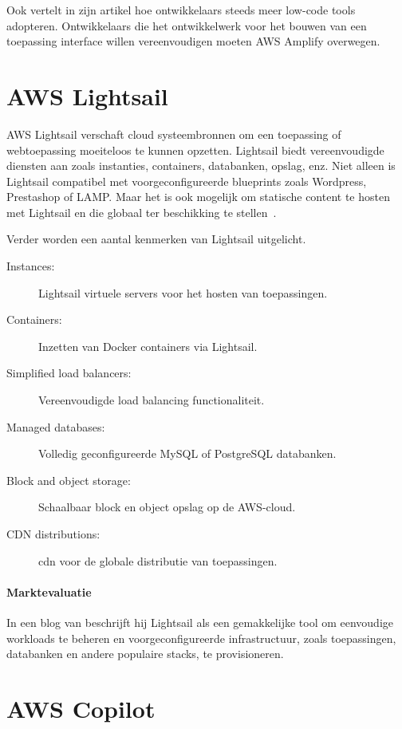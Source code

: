 Ook \textcite{Nwamba2022} vertelt in zijn artikel hoe ontwikkelaars steeds meer low-code tools adopteren.
Ontwikkelaars die het ontwikkelwerk voor het bouwen van een toepassing interface willen vereenvoudigen moeten AWS Amplify overwegen.

\section{AWS Lightsail}
\label{subsec:service-lightsail}

AWS Lightsail verschaft cloud systeembronnen om een toepassing of webtoepassing moeiteloos te kunnen opzetten.
Lightsail biedt vereenvoudigde diensten aan zoals instanties, containers, databanken, opslag, enz.
Niet alleen is Lightsail compatibel met voorgeconfigureerde blueprints zoals Wordpress, Prestashop of LAMP\@.
Maar het is ook mogelijk om statische content te hosten met Lightsail en die globaal ter beschikking te stellen~\autocite{AWSLightsail2022}.

Verder worden een aantal kenmerken van Lightsail uitgelicht.

\begin{description}
    \item[Instances: ] Lightsail virtuele servers voor het hosten van toepassingen.
    \item[Containers: ] Inzetten van Docker containers via Lightsail.
    \item[Simplified load balancers: ] Vereenvoudigde load balancing functionaliteit.
    \item[Managed databases: ] Volledig geconfigureerde MySQL of PostgreSQL databanken.
    \item[Block and object storage: ] Schaalbaar block en object opslag op de AWS-cloud.
    \item[CDN distributions: ] \acrfull{cdn} voor de globale distributie van toepassingen.
\end{description}

\paragraph{Marktevaluatie}

In een blog van \textcite{Warrier2022} beschrijft hij Lightsail als een gemakkelijke tool om eenvoudige workloads te beheren
en voorgeconfigureerde infrastructuur, zoals toepassingen, databanken en andere populaire stacks, te provisioneren.

\section{AWS Copilot}
\label{subsec:service-copilot}

